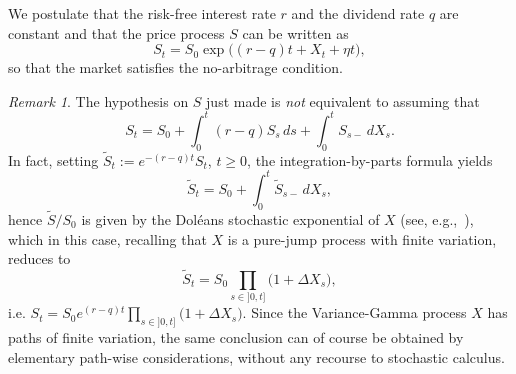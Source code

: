 \documentclass[11pt]{article}
\theoremstyle{remark}
\newtheorem{rmk}[prop]{Remark}
\begin{document}
We postulate that the risk-free interest rate $r$ and the dividend rate
$q$ are constant and that the price process $S$ can be written as
\[
S_t = S_0 \exp\bigl( (r-q)t + X_t + \eta t \bigr),
\]
so that the market satisfies the no-arbitrage condition. 
%
\begin{rmk}
  The hypothesis on $S$ just made is \emph{not} equivalent to assuming
  that
  \[
  S_t = S_0 + \int_0^t (r-q)S_s\,ds + \int_0^t S_{s-}\,dX_s.
  \]
  In fact, setting $\tilde{S}_t := e^{-(r-q)t}S_t$, $t \geq 0$, the
  integration-by-parts formula yields
  \[
  \tilde{S}_t = S_0 + \int_0^t \tilde{S}_{s-}\,dX_s,
  \]
  hence $\tilde{S}/S_0$ is given by the Dol\'eans stochastic
  exponential of $X$ (see, e.g.,~\cite[Theorem~26.8]{kall}), which in
  this case, recalling that $X$ is a pure-jump process with finite
  variation, reduces to
  \[
  \tilde{S}_t = S_0 \prod_{s\in]0,t]} \bigl(1+\Delta X_s\bigr),
  \]
  i.e.
  $S_t = S_0 e^{(r-q)t} \prod_{s\in]0,t]} \bigl(1+\Delta X_s\bigr)$.
  Since the Variance-Gamma process $X$ has paths of finite variation,
  the same conclusion can of course be obtained by elementary
  path-wise considerations, without any recourse to stochastic
  calculus.
\end{rmk}
%
\end{document}
